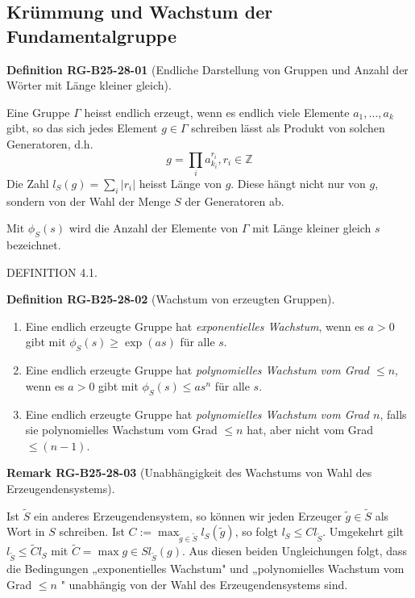 \documentclass[10pt, letterpaper]{article}
\newcommand{\CustomHeading}[3]{%
  \par\medskip\noindent%
  \textbf{#1 #2} \textnormal{(#3)}.\enskip%
}
\newenvironment{DEF}[2]{\begin{unitbox}\CustomHeading{Definition}{#1}{#2}}{\end{unitbox}}
\newenvironment{REM}[2]{\begin{unitbox}\CustomHeading{Remark}{#1}{#2}}{\end{unitbox}}
\begin{document}
\pagebreak

\subsection{Krümmung und Wachstum der Fundamentalgruppe}



\begin{DEF}{RG-B25-28-01}{Endliche Darstellung von Gruppen und Anzahl der Wörter mit Länge kleiner gleich}
Eine Gruppe $\Gamma$ heisst endlich erzeugt, wenn es endlich viele Elemente $a_{1}, \ldots, a_{k}$ gibt, so das sich jedes Element $g \in \Gamma$ schreiben lässt als Produkt von solchen Generatoren, d.h.
$$
g=\prod_{i} a_{k_{i}}^{r_{i}}, r_{i} \in \mathbb{Z}
$$
Die Zahl $l_{S}(g)=\sum_{i}\left|r_{i}\right|$ heisst Länge von $g$. Diese hängt nicht nur von $g$, sondern von der Wahl der Menge $S$ der Generatoren ab. 

Mit $\phi_{S}(s)$ wird die Anzahl der Elemente von $\Gamma$ mit Länge kleiner gleich $s$ bezeichnet.
\end{DEF}



DEFINITION 4.1. 


\begin{DEF}{RG-B25-28-02}{Wachstum von erzeugten Gruppen}
\begin{enumerate}
    \item Eine endlich erzeugte Gruppe hat \emph{exponentielles Wachstum}, wenn es $a > 0$ gibt mit $\phi_S(s) \geq \exp(a s)$ für alle $s$.
    \item Eine endlich erzeugte Gruppe hat \emph{polynomielles Wachstum vom Grad $\leq n$}, wenn es $a > 0$ gibt mit $\phi_S(s) \leq a s^n$ für alle $s$.
    \item Eine endlich erzeugte Gruppe hat \emph{polynomielles Wachstum vom Grad $n$}, falls sie polynomielles Wachstum vom Grad $\leq n$ hat, aber nicht vom Grad $\leq (n-1)$.
\end{enumerate}
\end{DEF}


\begin{REM}{RG-B25-28-03}{Unabhängigkeit des Wachstums von Wahl des Erzeugendensystems}
Ist $\widetilde{S}$ ein anderes Erzeugendensystem, so können wir jeden Erzeuger $\tilde{g} \in \tilde{S}$ als Wort in $S$ schreiben. Ist $C:=\max _{\tilde{g} \in \tilde{S}} l_{S}(\tilde{g})$, so folgt $l_{S} \leq C l_{\tilde{S}}$. Umgekehrt gilt $l_{\tilde{S}} \leq \tilde{C} l_{S}$ mit $\tilde{C}=\max g \in S l_{\tilde{S}}(g)$. Aus diesen beiden Ungleichungen folgt, dass die Bedingungen „exponentielles Wachstum" und „polynomielles Wachstum vom Grad $\leq n$ " unabhängig von der Wahl des Erzeugendensystems sind.
\end{REM}
\end{document}
